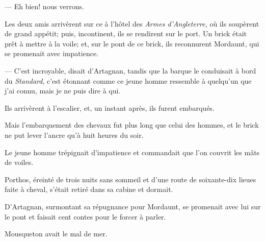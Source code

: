 — Eh bien! nous verrons.

Les deux amis arrivèrent sur ce à l'hôtel des \textit{Armes d'Angleterre,} où ils soupèrent de grand appétit; puis, incontinent, ils se rendirent sur le port. Un brick était prêt à mettre à la voile; et, sur le pont de ce brick, ils reconnurent Mordaunt, qui se promenait avec impatience.

— C'est incroyable, disait d'Artagnan, tandis que la barque le conduisait à bord du \textit{Standard}, c'est étonnant comme ce jeune homme ressemble à quelqu'un que j'ai connu, mais je ne puis dire à qui.

Ils arrivèrent à l'escalier, et, un instant après, ils furent embarqués.

Mais l'embarquement des chevaux fut plus long que celui des hommes, et le brick ne put lever l'ancre qu'à huit heures du soir.

Le jeune homme trépignait d'impatience et commandait que l'on couvrit les mâts de voiles.

Porthos, éreinté de trois nuits sans sommeil et d'une route de soixante-dix lieues faite à cheval, s'était retiré dans sa cabine et dormait.

D'Artagnan, surmontant sa répugnance pour Mordaunt, se promenait avec lui sur le pont et faisait cent contes pour le forcer à parler.

Mousqueton avait le mal de mer.